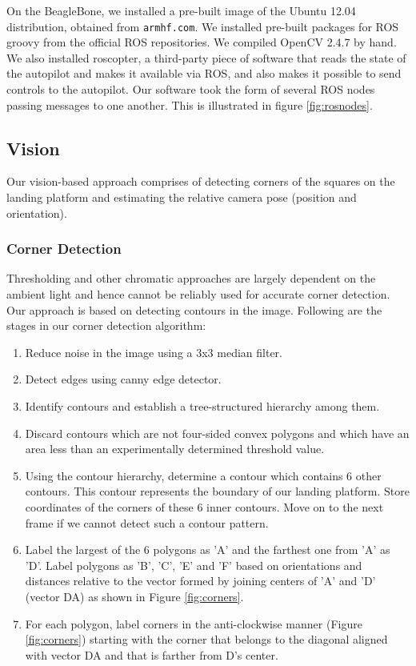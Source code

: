 \documentclass[10pt]{scrartcl} %
\begin{document}

On the BeagleBone, we installed a pre-built image of the Ubuntu 12.04
distribution, obtained from {\tt armhf.com}. We installed pre-built packages
for ROS groovy from the official ROS repositories. We compiled OpenCV 2.4.7 by
hand. We also installed roscopter, a third-party piece of software that reads
the state of the autopilot and makes it available via ROS, and also makes it
possible to send controls to the autopilot. Our software took the form of
several ROS nodes passing messages to one another. This is illustrated in
figure \ref{fig:rosnodes}.


\subsection{Vision}

Our vision-based approach comprises of detecting corners of the squares on the
landing platform and estimating the relative camera pose (position and orientation).

\subsubsection{Corner Detection}
Thresholding and other chromatic approaches are largely dependent on the ambient light
and hence cannot be reliably used for accurate corner detection. Our approach is based
on detecting contours in the image. Following are the stages in our corner detection
algorithm:

\begin{enumerate}
\item{Reduce noise in the image using a 3x3 median filter.}
\item{Detect edges using canny edge detector.}
\item{Identify contours and establish a tree-structured hierarchy among them.}
\item{Discard contours which are not four-sided convex polygons and which have an area
	less than an experimentally determined threshold value.}
\item{Using the contour hierarchy, determine a contour which contains 6 other contours.
	This contour represents the boundary of our landing platform. Store coordinates of
	the corners of these 6 inner contours. Move on to the next frame if we cannot detect
	such a contour pattern.}
\item{Label the largest of the 6 polygons as 'A' and the farthest one from 'A' as 'D'.
	Label polygons as 'B', 'C', 'E' and 'F' based on orientations and distances relative
	to the vector formed by joining centers of 'A' and 'D' (vector DA) as shown in
	Figure \ref{fig:corners}.}
\item{For each polygon, label corners in the anti-clockwise manner (Figure \ref{fig:corners})
	starting with the corner that belongs to the diagonal aligned with vector DA and that is
	farther from D's center.}
\end{enumerate}
\end{document}
